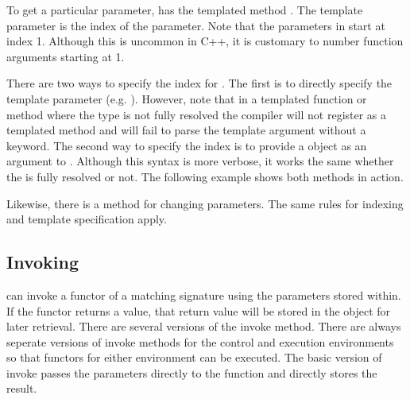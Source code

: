 To get a particular parameter,  has the
templated method . The template parameter is the
index of the parameter. Note that the parameters in
 start at index 1. Although this is
uncommon in C++, it is customary to number function arguments starting at
1.

There are two ways to specify the index for . The
first is to directly specify the template parameter (e.g.
). However, note that in a templated function
or method where the type is not fully resolved the compiler will not
register  as a templated method and will fail to
parse the template argument without a  keyword. The
second way to specify the index is to provide a 
object as an argument to . Although this syntax is
more verbose, it works the same whether the
 is fully resolved or not. The following
example shows both methods in action.


Likewise, there is a  method for changing parameters.
The same rules for indexing and template specification apply.


\subsection{Invoking}


 can invoke a functor of a matching
signature using the parameters stored within. If the functor returns a
value, that return value will be stored in the
 object for later retrieval. There are
several versions of the invoke method. There are always seperate versions
of invoke methods for the control and execution environments so that
functors for either environment can be executed. The basic version of
invoke passes the parameters directly to the function and directly stores
the result.


